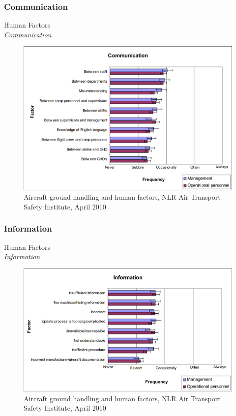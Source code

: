 \subsubsection{Communication}
\begin{frame}{Human Factors\\\textit{Communication}}{}
	\begin{figure}[H]
	\centering
	\includegraphics[width=\textwidth]{Grafik/CommunicationalFactors}
	\caption{Aircraft ground handling and human factors, NLR Air Transport Safety Institute, April 2010}
\end{figure}
\end{frame}

\subsubsection{Information}
\begin{frame}{Human Factors\\\textit{Information}}{}
	\begin{figure}[H]
	\centering
	\includegraphics[width=\textwidth]{Grafik/Information}
	\caption{Aircraft ground handling and human factors, NLR Air Transport Safety Institute, April 2010}
\end{figure}
\end{frame}


